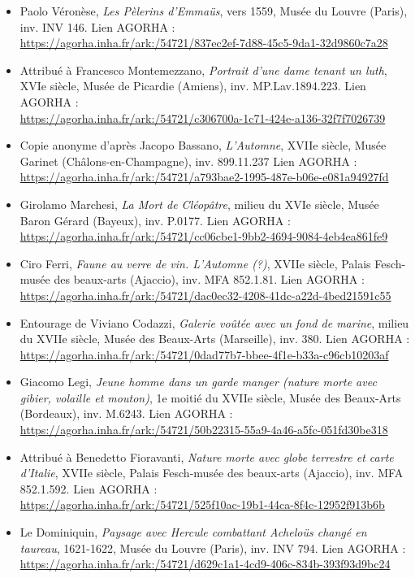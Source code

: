\begin{itemize}
    \item Paolo Véronèse, \textit{Les Pèlerins d'Emmaüs}, vers 1559, Musée du Louvre (Paris), inv. INV 146. Lien AGORHA : \\ \url{https://agorha.inha.fr/ark:/54721/837ec2ef-7d88-45c5-9da1-32d9860c7a28}
    \item Attribué à Francesco Montemezzano, \textit{Portrait d'une dame tenant un luth}, XVIe siècle, Musée de Picardie (Amiens), inv. MP.Lav.1894.223. Lien AGORHA : \\ \url{https://agorha.inha.fr/ark:/54721/c306700a-1c71-424e-a136-32f7f7026739}
    \item Copie anonyme d'après Jacopo Bassano, \textit{L'Automne}, XVIIe siècle, Musée Garinet (Châlons-en-Champagne), inv. 899.11.237 Lien AGORHA : \\ \url{https://agorha.inha.fr/ark:/54721/a793bae2-1995-487e-b06e-e081a94927fd}
    \item Girolamo Marchesi, \textit{La Mort de Cléopâtre}, milieu du XVIe siècle, Musée Baron Gérard (Bayeux), inv. P.0177. Lien AGORHA : \\ \url{https://agorha.inha.fr/ark:/54721/cc06cbe1-9bb2-4694-9084-4eb4ea861fe9}
    \item Ciro Ferri, \textit{Faune au verre de vin. L'Automne (?)}, XVIIe siècle, Palais Fesch-musée des beaux-arts (Ajaccio), inv. MFA 852.1.81. Lien AGORHA : \\ \url{https://agorha.inha.fr/ark:/54721/dac0ec32-4208-41dc-a22d-4bed21591c55}
    \item Entourage de Viviano Codazzi, \textit{Galerie voûtée avec un fond de marine}, milieu du XVIIe siècle, Musée des Beaux-Arts (Marseille), inv. 380. Lien AGORHA : \\ \url{https://agorha.inha.fr/ark:/54721/0dad77b7-bbee-4f1e-b33a-c96cb10203af}
    \item Giacomo Legi, \textit{Jeune homme dans un garde manger (nature morte avec gibier, volaille et mouton)}, 1e moitié du XVIIe siècle, Musée des Beaux-Arts (Bordeaux), inv. M.6243. Lien AGORHA : \\ \url{https://agorha.inha.fr/ark:/54721/50b22315-55a9-4a46-a5fc-051fd30be318}
    \item Attribué à Benedetto Fioravanti, \textit{Nature morte avec globe terrestre et carte d'Italie}, XVIIe siècle, Palais Fesch-musée des beaux-arts (Ajaccio), inv. MFA 852.1.592. Lien AGORHA : \\ \url{https://agorha.inha.fr/ark:/54721/525f10ac-19b1-44ca-8f4c-12952f913b6b}
    \item Le Dominiquin, \textit{Paysage avec Hercule combattant Acheloüs changé en taureau}, 1621-1622, Musée du Louvre (Paris), inv. INV 794. Lien AGORHA : \\ \url{https://agorha.inha.fr/ark:/54721/d629c1a1-4cd9-406c-834b-393f93d9bc24}

\end{itemize}
